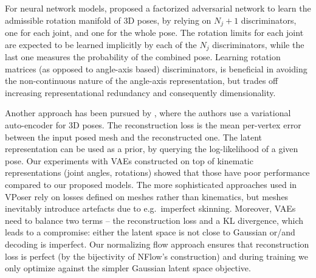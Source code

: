 \documentclass[runningheads]{llncs}
\newcommand{\eg}{e.g.\ }
\begin{document}
For neural network models, \cite{Kanazawa2018} proposed a factorized adversarial network to learn the admissible rotation manifold of 3D poses, by relying on $N_{j}+1$ discriminators, one for each joint, and one for the whole pose. The rotation limits for each joint are expected to be learned implicitly by each of the $N_{j}$ discriminators, while the last one measures the probability of the combined pose. Learning rotation matrices (as opposed to angle-axis based) discriminators, is beneficial in avoiding the non-continuous nature of the angle-axis representation, but trades off increasing representational redundancy and consequently dimensionality.

Another approach has been pursued by \cite{pavlakoscvpr2019}, where the authors use a variational auto-encoder for 3D poses. The reconstruction loss is the mean per-vertex error between the input posed mesh and the reconstructed one. The latent representation can be used as a prior, by querying the log-likelihood of a given pose.  Our experiments with VAEs constructed on top of kinematic representations (joint angles, rotations) showed that those have poor performance compared to our proposed models. The more sophisticated approaches used in VPoser \cite{pavlakoscvpr2019} rely on losses defined on meshes rather than kinematics, but meshes inevitably introduce artefacts due to \eg imperfect skinning.
Moreover, VAEs need to balance two terms -- the reconstruction loss and a KL divergence, which leads to a compromise: either the latent space is not close to Gaussian or/and decoding is imperfect. Our normalizing flow approach ensures that reconstruction loss is perfect (by the bijectivity of NFlow's construction) and during training we only optimize against the simpler Gaussian latent space objective. 
\end{document}

